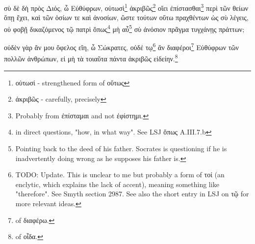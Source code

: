 σὺ
δὲ
δὴ
πρὸς
Διός,
ὦ
Εὐθύφρων,
οὑτωσὶ\footnote{οὑτωσί - strengthened form of οὕτως}
ἀκριβῶς\footnote{ἀκριβῶς - carefully, precisely}
οἴει
ἐπίστασθαι\footnote{Probably from ἐπίσταμαι and not ἐφίστημι.}
περὶ
τῶν
θείων
ὅπῃ
ἔχει,
καὶ
τῶν
ὁσίων
τε
καὶ
ἀνοσίων,
ὥστε
τούτων
οὕτω
πραχθέντων
ὡς
σὺ
λέγεις,
οὐ
φοβῇ
δικαζόμενος
τῷ
πατρὶ
ὅπως\footnote{in direct questions, "how, in what way". See LSJ ὅπως A.III.7.b}
μὴ
αὖ\footnote{Pointing back to the deed of his father. Socrates is questioning if he is inadvertently doing wrong as he supposes his father is.}
σὺ
ἀνόσιον
πρᾶγμα
τυγχάνῃς
πράττων;

οὐδὲν
γὰρ
ἄν
μου
ὄφελος
εἴη,
ὦ
Σώκρατες,
οὐδέ
\versification{[5a]}
τῳ\footnote{TODO: Update. This is unclear to me but probably a form of τοί (an enclytic, which explains the lack of accent), meaning something like "therefore". See Smyth section 2987. See also the short entry in LSJ on τῷ for more relevant ideas.}
ἂν
διαφέροι\footnote{ of διαφέρω.}
Εὐθύφρων
τῶν
πολλῶν
ἀνθρώπων,
εἰ
μὴ
τὰ
τοιαῦτα
πάντα
ἀκριβῶς
εἰδείην.\footnote{ of οἶδα.}






